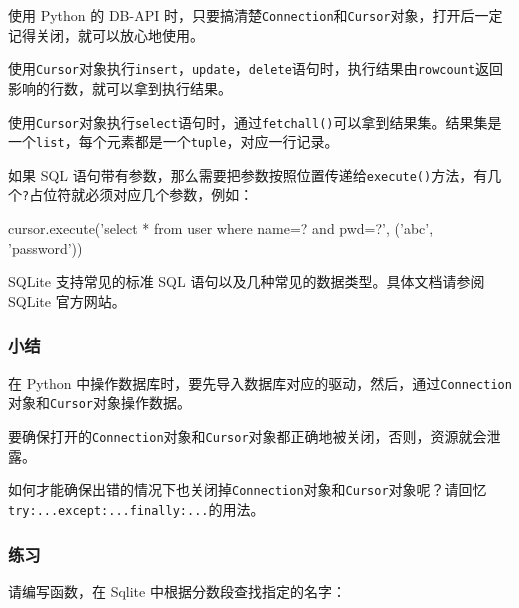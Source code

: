 使用 Python 的 DB-API
时，只要搞清楚\texttt{Connection}和\texttt{Cursor}对象，打开后一定记得关闭，就可以放心地使用。

使用\texttt{Cursor}对象执行\texttt{insert}，\texttt{update}，\texttt{delete}语句时，执行结果由\texttt{rowcount}返回影响的行数，就可以拿到执行结果。

使用\texttt{Cursor}对象执行\texttt{select}语句时，通过\texttt{fetchall()}可以拿到结果集。结果集是一个\texttt{list}，每个元素都是一个\texttt{tuple}，对应一行记录。

如果 SQL
语句带有参数，那么需要把参数按照位置传递给\texttt{execute()}方法，有几个\texttt{?}占位符就必须对应几个参数，例如：

\begin{pythoncode}
cursor.execute('select * from user where name=? and pwd=?', ('abc', 'password'))
\end{pythoncode}

SQLite 支持常见的标准 SQL 语句以及几种常见的数据类型。具体文档请参阅
SQLite 官方网站。

\hypertarget{ux5c0fux7ed3}{%
\subsubsection{小结}\label{ux5c0fux7ed3}}

在 Python
中操作数据库时，要先导入数据库对应的驱动，然后，通过\texttt{Connection}对象和\texttt{Cursor}对象操作数据。

要确保打开的\texttt{Connection}对象和\texttt{Cursor}对象都正确地被关闭，否则，资源就会泄露。

如何才能确保出错的情况下也关闭掉\texttt{Connection}对象和\texttt{Cursor}对象呢？请回忆\texttt{try:...except:...finally:...}的用法。

\hypertarget{ux7ec3ux4e60}{%
\subsubsection{练习}\label{ux7ec3ux4e60}}

请编写函数，在 Sqlite 中根据分数段查找指定的名字：

